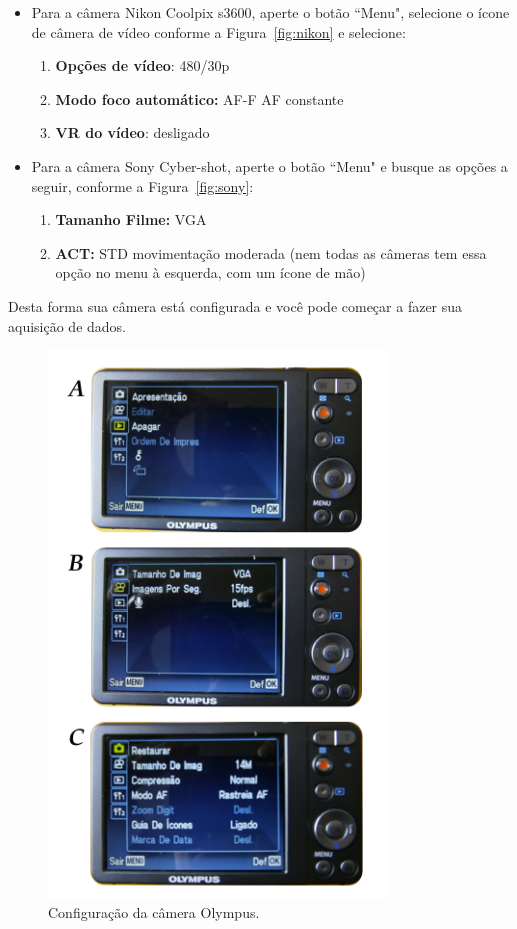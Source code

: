 \begin{enumerate}
\begin{itemize}
\item Para a câmera Nikon Coolpix s3600, aperte o botão ``Menu", selecione o ícone de câmera de vídeo conforme a Figura~\ref{fig:nikon} e selecione:
\begin{enumerate}
\item {\bf Opções de vídeo}: 480/30p
\item {\bf Modo foco automático:} AF-F AF constante
\item {\bf VR do vídeo}: desligado
\end{enumerate}
\item Para a câmera Sony Cyber-shot, aperte o botão ``Menu" e busque as opções a seguir, conforme a Figura~\ref{fig:sony}: 
\begin{enumerate}
\item {\bf Tamanho Filme:} VGA
\item {\bf ACT:} STD movimentação moderada (nem todas as câmeras tem essa opção no menu à esquerda, com um ícone de mão)
\end{enumerate}
\end{itemize} 
\end{enumerate}

Desta forma sua câmera está configurada e você pode começar a fazer sua aquisição de dados. 
\begin{figure}[t!]
\begin{center}
\includegraphics[width=9cm]{fig/CameraOlympus.png}
\caption{\label{fig:camera} Configuração da câmera Olympus.}
\vspace{-0.5cm}
\end{center}
\end{figure}

